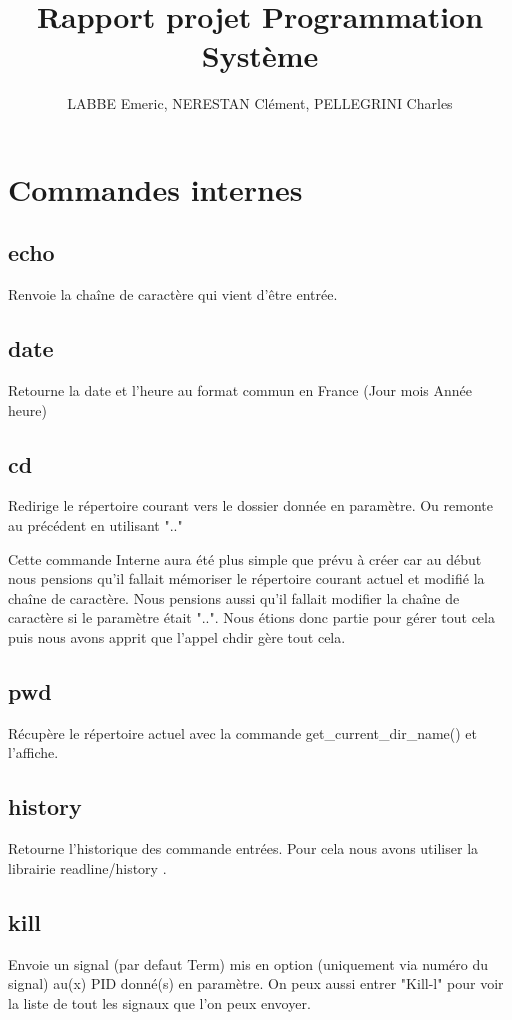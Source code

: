 \documentclass[12pt]{article}
\author{LABBE Emeric, NERESTAN Clément, PELLEGRINI Charles}
\title{Rapport projet Programmation Système}
\begin{document}
\maketitle
\tableofcontents

\newpage
\section{Commandes internes}

\subsection{echo}
Renvoie la chaîne de caractère qui vient d’être entrée.

\subsection{date}
Retourne la date et l'heure au format commun en France (Jour mois Année heure)
\subsection{cd}
Redirige le répertoire courant vers le dossier donnée en paramètre. Ou remonte au précédent en utilisant ".." 

Cette commande Interne aura été plus simple que prévu à créer car au début nous pensions qu'il fallait mémoriser le répertoire courant actuel et modifié la chaîne de caractère. Nous pensions aussi qu'il fallait modifier la chaîne de caractère si le paramètre était "..". Nous étions donc partie pour gérer tout cela puis nous avons apprit que l'appel chdir gère tout cela.
\subsection{pwd}
Récupère le répertoire actuel avec la commande get\_current\_dir\_name() et l'affiche.

\subsection{history}
Retourne l'historique des commande entrées. Pour cela nous avons utiliser la librairie readline/history .

\subsection{kill}
Envoie un signal (par defaut Term) mis en option (uniquement via numéro du signal) au(x) PID donné(s) en paramètre. On peux aussi entrer "Kill-l" pour voir la liste de tout les signaux que l'on peux envoyer.
\end{document}
